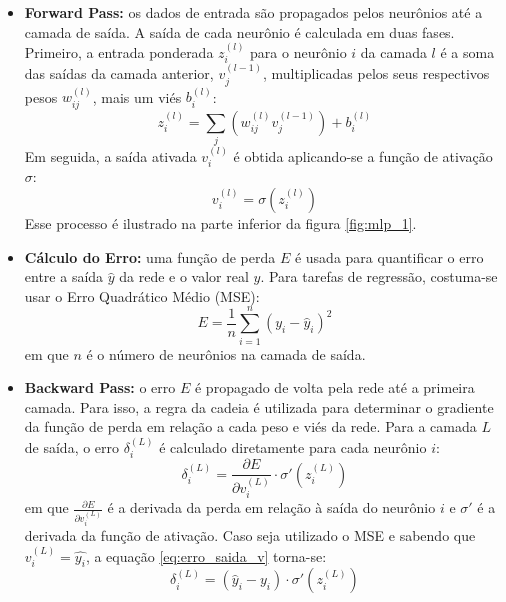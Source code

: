 \begin{itemize}
\item \textbf{Forward Pass:} os dados de entrada são propagados pelos neurônios até a camada de saída. A saída de cada 
neurônio é calculada em duas fases. Primeiro, a entrada ponderada $ z_i^{(l)} $ para o neurônio $ i $ da camada
$ l $ é a soma das saídas da camada anterior, $ v_j^{(l-1)} $, multiplicadas pelos seus respectivos pesos $ w_{ij}^{(l)} $, 
mais um viés $ b_i^{(l)} $:
\begin{equation}
\label{eq:soma_ponderada_u}
z_i^{(l)} = \sum_{j} (w_{ij}^{(l)} v_j^{(l-1)}) + b_i^{(l)}
\end{equation}
Em seguida, a saída ativada $ v_i^{(l)} $ é obtida aplicando-se a função de ativação $ \sigma $:
\begin{equation}
\label{eq:ativacao_v}
v_i^{(l)} = \sigma(z_i^{(l)})
\end{equation}
Esse processo é ilustrado na parte inferior da figura \ref{fig:mlp_1}.

\item \textbf{Cálculo do Erro:} uma função de perda $ E $ é usada para quantificar o erro entre a saída $ \hat{y} $ da 
rede e o valor real $ y $. Para tarefas de regressão, costuma-se usar o Erro Quadrático Médio (MSE):
\begin{equation}
\label{eq:mse_v}
E = \frac{1}{n} \sum_{i=1}^{n} (y_{i} - \hat{y}_i)^2
\end{equation}
em que $ n $ é o número de neurônios na camada de saída.

\item \textbf{Backward Pass:} o erro $ E $ é propagado de volta pela rede até a primeira camada. Para isso, a regra da cadeia 
é utilizada para determinar o gradiente da função de perda em relação a cada peso e viés da rede. Para a camada $ L $ de saída, 
o erro $ \delta_i^{(L)} $ é calculado diretamente para cada neurônio $ i $:
\begin{equation}
\label{eq:erro_saida_v}
\delta_i^{(L)} = \frac{\partial E}{\partial v_i^{(L)}} \cdot \sigma'(z_i^{(L)})
\end{equation}
em que $\frac{\partial E}{\partial v_i^{(L)}}$ é a derivada da perda em relação à saída do neurônio $i$ e $\sigma'$ é a 
derivada da função de ativação. Caso seja utilizado o MSE e sabendo que $ v_i^{(L)} = \hat{y_i} $, a equação 
\ref{eq:erro_saida_v} torna-se:
\begin{equation}
\label{eq:erro_saida_mse_v}
\delta_i^{(L)} = (\hat{y}_i - y_i) \cdot \sigma'(z_i^{(L)})
\end{equation}


\end{itemize}
